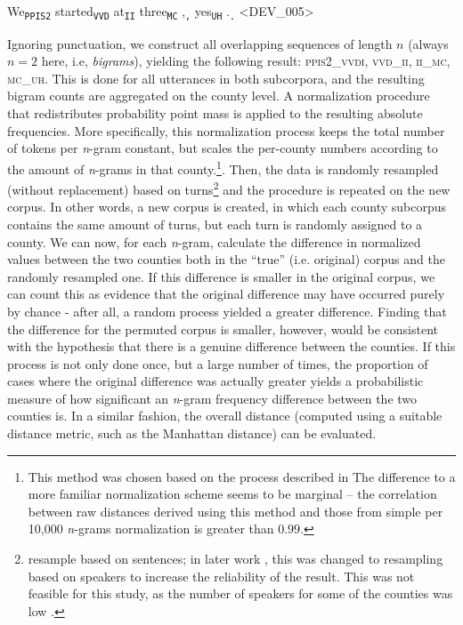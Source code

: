 \documentclass[output=paper]{LSP/langsci}
\begin{document}
\begin{exe}
\ex We\textsubscript{\texttt{PPIS2}} started\textsubscript{\texttt{VVD}} at\textsubscript{\texttt{II}} three\textsubscript{\texttt{MC}} ,\textsubscript{\texttt{,}} yes\textsubscript{\texttt{UH}} .\textsubscript{\texttt{.}}  <DEV\_005>
\end{exe}

Ignoring punctuation, we construct all overlapping sequences of length $n$ (always $n=2$ here, i.e, \emph{bigrams}), yielding the following result: \textsc{ppis2\_vvdi}, \textsc{vvd\_ii}, \textsc{ii\_mc}, \textsc{mc\_uh}. 
This is done for all utterances in both subcorpora, and the resulting bigram counts are aggregated on the county level.
A normalization procedure that redistributes probability point mass is applied to the resulting absolute frequencies.
More specifically, this normalization process keeps the total number of tokens per \emph{n}-gram constant, but scales the per-county numbers according to the amount of \emph{n}-grams in that county.\footnote{This method was chosen based on the process described in \citet{nerbonne_measure_2006}
The difference to a more familiar normalization scheme seems to be marginal -- the correlation between raw distances derived using this method and those from simple per 10,000 \emph{n}-grams normalization is greater than $0.99$.}.
Then, the data is randomly resampled (without replacement) based on turns\footnote{\citet{nerbonne_measure_2006} resample based on sentences; in later work \citep{wiersma_automatically_2011}, this was changed to resampling based on speakers to increase the reliability of the result.
This was not feasible for this study, as the number of speakers for some of the counties was low \citep[see also][]{sanders_statistical_2010}.}
and the procedure is repeated on the new corpus.
In other words, a new corpus is created, in which each county subcorpus contains the same amount of turns, but each turn is randomly assigned to a county.
We can now, for each \emph{n}-gram, calculate the difference in normalized values between the two counties both in the ``true'' (i.e. original) corpus and the randomly resampled one.
If this difference is smaller in the original corpus, we can count this as evidence that the original difference may have occurred purely by chance - after all, a random process yielded a greater difference.
Finding that the difference for the permuted corpus is smaller, however, would be consistent with the hypothesis that there is a genuine difference between the counties.
If this process is not only done once, but a large number of times, the proportion of cases where the original difference was actually greater yields a probabilistic measure of how significant an \emph{n}-gram frequency difference between the two counties is.
In a similar fashion, the overall distance (computed using a suitable distance metric, such as the Manhattan distance) can be evaluated.
\end{document}
